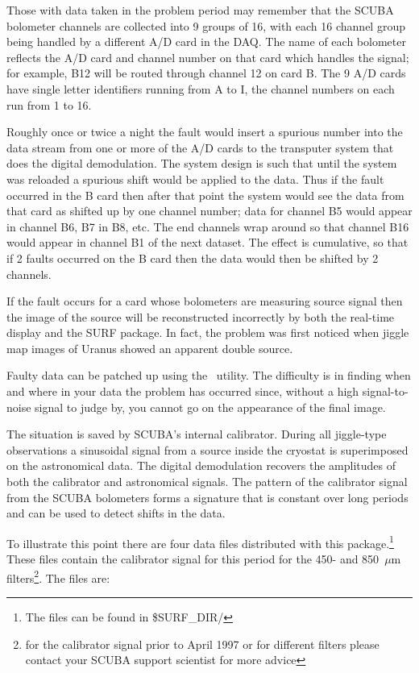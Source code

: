 \documentclass[twoside,11pt]{starlink}
\providecommand{\task}[1]{#1}
\providecommand{\scushift}{\htmlref{\task{scushift}}{SCUSHIFT}}
\begin{document}
Those with data taken in the problem period may remember that the
SCUBA bolometer channels are collected into 9 groups of 16, with each 16
channel group being handled by a different A/D card in the DAQ. The name
of each bolometer reflects the A/D card and channel number on that card
which handles the signal; for example, B12 will be routed through channel
12 on card B. The 9 A/D cards have single letter identifiers running from
A to I, the channel numbers on each run from 1 to 16.

Roughly once or twice a night the fault would insert a spurious number
into the data stream from one or more of the A/D cards to the transputer
system that does the digital demodulation. The system design is such that
until the system was reloaded a spurious shift would be applied to the
data. Thus if the fault occurred in the B card then after that point the
system would see the data from that card as shifted up by one channel
number; data for channel B5 would appear in channel B6, B7 in B8, etc. The
end channels wrap around so that channel B16 would appear in channel B1 of
the next dataset. The effect is cumulative, so that if 2 faults occurred
on the B card then the data would then be shifted by 2 channels.

If the fault occurs for a card whose bolometers are measuring source
signal then the image of the source will be reconstructed incorrectly by
both the real-time display and the SURF package. In fact, the problem was
first noticed when jiggle map images of Uranus showed an apparent double
source.

Faulty data can be patched up using the \scushift\  utility. The difficulty is
in finding when and where in your data the problem has occurred since,
without a high signal-to-noise signal to judge by, you cannot go on the
appearance of the final image.

The situation is saved by SCUBA's internal calibrator. During all
jiggle-type observations a sinusoidal signal from a source inside the
cryostat is superimposed on the astronomical data. The digital
demodulation recovers the amplitudes of both the calibrator and
astronomical signals. The pattern of the calibrator signal from the SCUBA
bolometers forms a signature that is constant over long periods and can be
used to detect shifts in the data.

To illustrate this point there are four data files distributed with this
package.\footnote{The files can be found in \$SURF\_DIR/}
These files contain the calibrator signal for this period for the
450- and 850~$\mu$m filters\footnote{for the calibrator signal prior to April
1997 or for different filters please contact your SCUBA support scientist for
more advice}. The files are:
\end{document}
